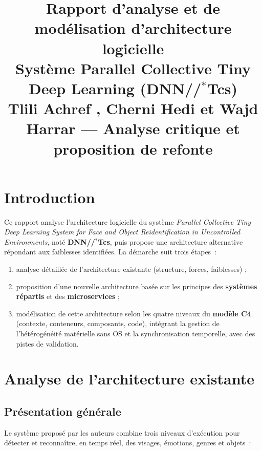 \documentclass[11pt,a4paper]{article}
\title{\textbf{Rapport d'analyse et de modélisation d'architecture logicielle}\\[4pt]
\large Système Parallel Collective Tiny Deep Learning (DNN//\(^{*}\)Tcs)\\
\normalsize Tlili Achref , Cherni Hedi et Wajd Harrar --- Analyse critique et proposition de refonte}
\author{}
\date{}
\begin{document}
\maketitle

\tableofcontents
\newpage

\section{Introduction}

Ce rapport analyse l'architecture logicielle du système
\emph{Parallel Collective Tiny Deep Learning System for Face and Object
Reidentification in Uncontrolled Environments},
noté \textbf{DNN//\(^{*}\)Tcs}, puis propose une architecture alternative
répondant aux faiblesses identifiées. La démarche suit trois étapes~:

\begin{enumerate}
    \item analyse détaillée de l'architecture existante (structure, forces,
    faiblesses) ;
    \item proposition d'une nouvelle architecture basée sur les principes des
    \textbf{systèmes répartis} et des \textbf{microservices} ;
    \item modélisation de cette architecture selon les quatre niveaux du
    \textbf{modèle C4} (contexte, conteneurs, composants, code), intégrant la
    gestion de l'hétérogénéité matérielle sans OS et la synchronisation temporelle, avec des
    pistes de validation.
\end{enumerate}

\section{Analyse de l'architecture existante}

\subsection{Présentation générale}

Le système proposé par les auteurs combine trois niveaux d'exécution pour
détecter et reconnaître, en temps réel, des visages, émotions, genres et
objets~:
\end{document}
